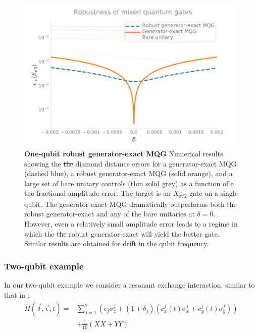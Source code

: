 \documentclass[aps,nofootinbib,pra,notitlepage,twocolumn]{revtex4-1}
\newcommand{\0}{\ensuremath{\mathbf{0}}}
\providecommand{\DIFdeltex}[1]{{\protect\color{red}\sout{#1}}}                      %
\providecommand{\DIFdelFL}[1]{\DIFdel{#1}} %
\providecommand{\DIFaddbeginFL}{} %
\providecommand{\DIFaddendFL}{} %
\providecommand{\DIFdelbeginFL}{} %
\providecommand{\DIFdelendFL}{} %
\providecommand{\DIFdel}[1]{\texorpdfstring{\DIFdeltex{#1}}{}} %
\newcommand{\DIFscaledelfig}{0.5}
\newlength{\DIFdelgraphicswidth} %
\newlength{\DIFdelgraphicsheight} %
\newcommand{\DIFaddincludegraphics}[2][]{{\color{blue}\fbox{\DIFOincludegraphics[#1]{#2}}}} %
\newcommand{\DIFdelincludegraphics}[2][]{%
\sbox{\DIFdelgraphicsbox}{\DIFOincludegraphics[#1]{#2}}%
\settoboxwidth{\DIFdelgraphicswidth}{\DIFdelgraphicsbox} %
\settoboxtotalheight{\DIFdelgraphicsheight}{\DIFdelgraphicsbox} %
\scalebox{\DIFscaledelfig}{%
\parbox[b]{\DIFdelgraphicswidth}{\usebox{\DIFdelgraphicsbox}\\[-\baselineskip] \rule{\DIFdelgraphicswidth}{0em}}\llap{\resizebox{\DIFdelgraphicswidth}{\DIFdelgraphicsheight}{%
\setlength{\unitlength}{\DIFdelgraphicswidth}%
\begin{picture}(1,1)%
\thicklines\linethickness{2pt} %
{\color[rgb]{1,0,0}\put(0,0){\framebox(1,1){}}}%
{\color[rgb]{1,0,0}\put(0,0){\line( 1,1){1}}}%
{\color[rgb]{1,0,0}\put(0,1){\line(1,-1){1}}}%
\end{picture}%
}\hspace*{3pt}}} %
} %
\DeclareRobustCommand{\DIFaddbeginFL}{\DIFOaddbeginFL \let\includegraphics\DIFaddincludegraphics} %
\DeclareRobustCommand{\DIFaddendFL}{\DIFOaddendFL \let\includegraphics\DIFOincludegraphics} %
\DeclareRobustCommand{\DIFdelbeginFL}{\DIFOdelbeginFL \let\includegraphics\DIFdelincludegraphics} %
\DeclareRobustCommand{\DIFdelendFL}{\DIFOaddendFL \let\includegraphics\DIFOincludegraphics} %
\begin{document}
{\begin{figure}[h]
  \centering
  \DIFdelbeginFL %
\DIFdelendFL \DIFaddbeginFL \includegraphics[width=\columnwidth]{1q_robustness_delta.pdf}
  \DIFaddendFL \caption{\textbf{One-qubit robust generator-exact MQG} Numerical results showing the \DIFdelbeginFL \DIFdelFL{the }\DIFdelendFL diamond distance errors for a generator-exact MQG (dashed blue), a robust generator-exact MQG (solid orange), and a large set of bare unitary controls (thin solid grey) as a function of a the fractional amplitude error. The target is an $X_{\pi/2}$ gate on a single qubit. The generator-exact MQG dramatically outperforms both the robust generator-exact and any of the bare unitaries at $\delta=0$. However, even a relatively small amplitude error leads to a regime in which the \DIFdelbeginFL \DIFdelFL{the }\DIFdelendFL robust generator-exact will yield the better gate. Similar results are obtained for drift in the qubit frequency.}
  \label{fig:YMQG}
\end{figure}

\subsubsection{Two-qubit example} 
\label{sub:two_qubit}
In our two-qubit example we consider a resonant exchange interaction, similar to that in \cite{McKay2016}:
\begin{equation} \label{eq:2Qham}
\begin{split}
H(\vec{\delta}, \vec{\epsilon}, t) = &\sum_{j=1}^2(\epsilon_j\sigma_z^j + (1 + \delta_j)(c_x^j(t)\sigma_x^j + c_y^j(t)\sigma_y^j)) \\
&+ \frac{1}{10}(XX + YY)
\end{split}
\end{equation}

}
\end{document}
